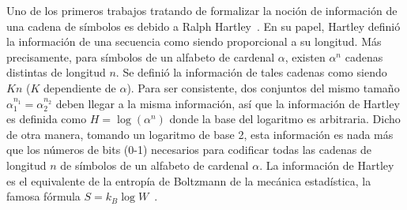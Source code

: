 \label{Sec:SZ:Entropia}


\label{Ssec:SZ:DefinicionShannon}

Uno de los primeros trabajos tratando de formalizar la noci\'on de informaci\'on
de  una cadena  de s\'imbolos  es debido  a Ralph  Hartley~\cite{Har28}.   En su
papel,  Hartley  defini\'o  la   informaci\'on  de  una  secuencia  como  siendo
proporcional a su longitud.  M\'as  precisamente, para s\'imbolos de un alfabeto
de cardenal $\alpha$,  existen $\alpha^n$ cadenas distintas de  longitud $n$. Se
defini\'o la informaci\'on  de tales cadenas como siendo  $K n$ ($K$ dependiente
de  $\alpha$).    Para  ser  consistente,  dos  conjuntos   del  mismo  tama\~no
$\alpha_1^{n_1} =  \alpha_2^{n_2}$ deben llegar a la  misma informaci\'on, as\'i
que  la informaci\'on  de  Hartley es  definida  como $H  = \log\left(  \alpha^n
\right)$  donde la  base del  logaritmo es  arbitraria.  Dicho  de  otra manera,
tomando  un logaritmo  de  base 2,  esta  informaci\'on es  nada  m\'as que  los
n\'umeros de bits (0-1) necesarios  para codificar todas las cadenas de longitud
$n$  de s\'imbolos de  un alfabeto  de cardenal  $\alpha$.  La  informaci\'on de
Hartley  es  el equivalente  de  la entrop\'ia  de  Boltzmann  de la  mec\'anica
estad\'istica, la famosa  f\'ormula $S = k_B \log  W$~\cite{Bol96, Bol98, Jay65,
  Mer10, Mer18}.

